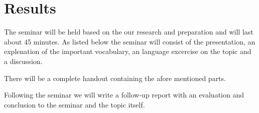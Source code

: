 \section*{Results}
The seminar will be held based on the our research and preparation and will last about 45 minutes. As listed below the seminar will consist of the presentation, an explenation of the important vocabulary, an language excercise on the topic and a discussion.

There will be a complete handout containing the afore mentioned parts.

Following the seminar we will write a follow-up report with an evaluation and conclusion to the seminar and the topic itself.
